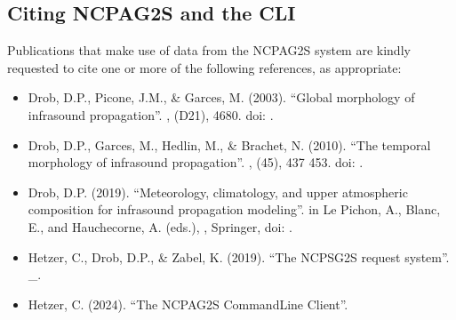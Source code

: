 \documentclass[letterpaper,10pt,english]{sphinxmanual}
\begin{document}
\subsection{Citing NCPA\sphinxhyphen{}G2S and the CLI}
\label{\detokenize{authorship:citing-ncpa-g2s-and-the-cli}}
\sphinxAtStartPar
Publications that make use of data from the NCPA\sphinxhyphen{}G2S system are kindly requested to cite one or more of the following references, as appropriate:
\begin{description}
\begin{itemize}
\item {} 
\sphinxAtStartPar
Drob, D.P., Picone, J.M., \& Garces, M. (2003). “Global morphology of infrasound propagation”. ,  (D21), 4680. doi: .

\item {} 
\sphinxAtStartPar
Drob, D.P., Garces, M., Hedlin, M., \& Brachet, N. (2010). “The temporal morphology of infrasound propagation”. ,  (4\sphinxhyphen{}5), 437 \textendash{} 453. doi: .

\item {} 
\sphinxAtStartPar
Drob, D.P. (2019). “Meteorology, climatology, and upper atmospheric composition for infrasound propagation modeling”. in Le Pichon, A., Blanc, E., and Hauchecorne, A. (eds.), , Springer, doi: .

\end{itemize}

\begin{itemize}
\item {} 
\sphinxAtStartPar
Hetzer, C., Drob, D.P., \& Zabel, K. (2019). “The NCPS\sphinxhyphen{}G2S request system”.   \_.

\item {} 
\sphinxAtStartPar
Hetzer, C. (2024). “The NCPAG2S Command\sphinxhyphen{}Line Client”.

\end{itemize}

\end{description}
\end{document}
